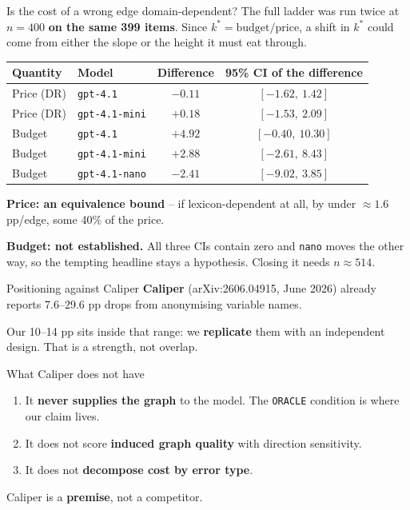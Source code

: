 \documentclass{beamer}
\begin{document}
\begin{frame}{Is the cost of a wrong edge domain-dependent?}
  The full ladder was run twice at $n{=}400$ \textbf{on the same 399 items}.
  Since $k^* = \text{budget}/\text{price}$, a shift in $k^*$ could come from
  either the slope or the height it must eat through.

  \begin{center}
  \small
  \begin{tabular}{llcc}
    \toprule
    Quantity & Model & Difference & 95\% CI \textbf{of the difference} \\
    \midrule
    Price (DR) & \texttt{gpt-4.1}      & $-0.11$ & $[-1.62,\ 1.42]$ \\
    Price (DR) & \texttt{gpt-4.1-mini} & $+0.18$ & $[-1.53,\ 2.09]$ \\
    \midrule
    Budget & \texttt{gpt-4.1}      & $+4.92$ & $[-0.40,\ 10.30]$ \\
    Budget & \texttt{gpt-4.1-mini} & $+2.88$ & $[-2.61,\ 8.43]$ \\
    Budget & \texttt{gpt-4.1-nano} & $\mathbf{-2.41}$ & $[-9.02,\ 3.85]$ \\
    \bottomrule
  \end{tabular}
  \end{center}

  \textbf{Price: an equivalence bound} -- if lexicon-dependent at all, by under
  $\approx 1.6$ pp/edge, some 40\% of the price.

  \textbf{Budget: not established.} All three CIs contain zero and
  \texttt{nano} moves the other way, so the tempting headline stays a
  hypothesis. Closing it needs $n \approx 514$.
\end{frame}

\begin{frame}{Positioning against Caliper}
  \textbf{Caliper} (arXiv:2606.04915, June 2026) already reports 7.6--29.6 pp
  drops from anonymising variable names.

  \vspace{0.2cm}
  Our 10--14 pp sits inside that range: we \textbf{replicate} them with an
  independent design. That is a strength, not overlap.

  \vspace{0.3cm}
  \begin{block}{What Caliper does not have}
    \begin{enumerate}
      \item It \textbf{never supplies the graph} to the model. The
        \texttt{ORACLE} condition is where our claim lives.
      \item It does not score \textbf{induced graph quality} with
        direction sensitivity.
      \item It does not \textbf{decompose cost by error type}.
    \end{enumerate}
  \end{block}

  \vspace{0.2cm}
  Caliper is a \textbf{premise}, not a competitor.
\end{frame}
\end{document}
